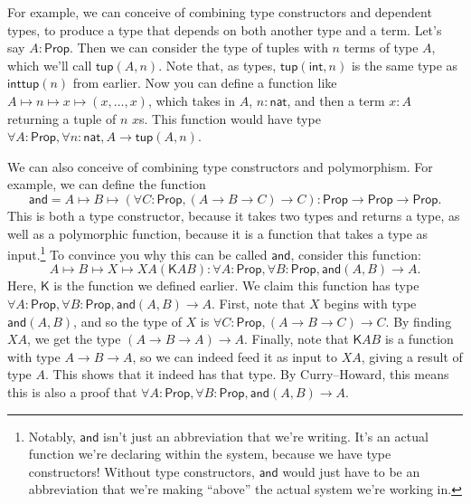 \documentclass[11pt,paper=letter]{scrartcl}
\newcommand{\sf}{\mathsf}
\newcommand{\prop}{\mathsf{Prop}}
\begin{document}
For example, we can conceive of combining type constructors and dependent types, to produce a type that depends on both another type and a term. Let's say $A: \prop$. Then we can consider the type of tuples with $n$ terms of type $A$, which we'll call $\sf{tup}(A, n)$. Note that, as types, $\sf{tup}(\sf{int}, n)$ is the same type as $\sf{inttup}(n)$ from earlier. Now you can define a function like $A \mapsto n \mapsto x \mapsto (x, \ldots, x)$, which takes in $A$, $n : \sf{nat}$, and then a term $x : A$ returning a tuple of $n$ $x$s. This function would have type $\forall A: \prop, \forall n: \sf{nat}, A \to \sf{tup}(A, n)$.

We can also conceive of combining type constructors and polymorphism. For example, we can define the function \[
  \sf{and} = A \mapsto B \mapsto (\forall C: \prop, (A \to B \to C) \to C)
  : \prop \to \prop \to \prop.
\]
This is both a type constructor, because it takes two types and returns a type, as well as a polymorphic function, because it is a function that takes a type as input.\footnote{Notably, $\sf{and}$ isn't just an abbreviation that we're writing. It's an actual function we're declaring within the system, because we have type constructors! Without type constructors, $\sf{and}$ would just have to be an abbreviation that we're making ``above'' the actual system we're working in.} To convince you why this can be called $\sf{and}$, consider this function: \[
  A \mapsto B \mapsto X \mapsto XA(\sf{K}AB)
  : \forall A: \prop,
  \forall B: \prop,
  \sf{and}(A, B) \to A.
\]
Here, $\sf{K}$ is the function we defined earlier. We claim this function has type $\forall A: \prop, \forall B: \prop, \sf{and}(A, B) \to A$. First, note that $X$ begins with type $\sf{and}(A, B)$, and so the type of $X$ is $\forall C: \prop, (A \to B \to C) \to C$. By finding $XA$, we get the type $(A \to B \to A) \to A$. Finally, note that $\sf{K}AB$ is a function with type $A \to B \to A$, so we can indeed feed it as input to $XA$, giving a result of type $A$. This shows that it indeed has that type. By Curry--Howard, this means this is also a proof that $\forall A: \prop, \forall B: \prop, \sf{and}(A, B) \to A$.
\end{document}
